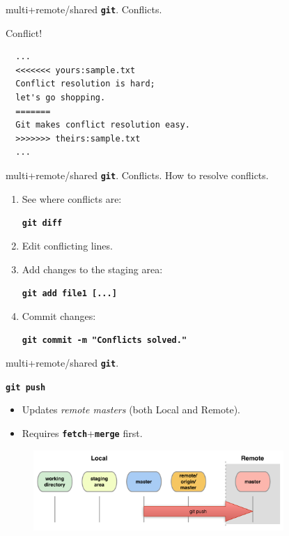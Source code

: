 \documentclass{beamer}
\newcommand{\git}{\texttt{\textbf{git}}\xspace}
\begin{document}
\begin{frame}[containsverbatim]{multi+remote/shared \git. Conflicts.}
  \begin{center}
    \alert{Conflict!}
  \end{center}
\begin{verbatim}
  ...
  <<<<<<< yours:sample.txt
  Conflict resolution is hard;
  let's go shopping.
  =======
  Git makes conflict resolution easy.
  >>>>>>> theirs:sample.txt
  ...
\end{verbatim}
\end{frame}


\begin{frame}{multi+remote/shared \git. Conflicts.}
How to resolve conflicts.
\begin{enumerate}
\item See where conflicts are:
  \begin{center}
  \texttt{\textbf{git diff}}
  \end{center}
\item Edit conflicting lines.
\item Add changes to the staging area:
  \begin{center}
    \texttt{\textbf{git add file1 [...]}}
  \end{center}
\item Commit changes:
  \begin{center}
    \texttt{\textbf{git commit -m "Conflicts solved."}}
  \end{center}
\end{enumerate}
\end{frame}

\begin{frame}{multi+remote/shared \git.}
  \begin{center}
    \texttt{\textbf{git push}}
  \end{center}
  \begin{itemize}
  \item Updates \emph{remote masters} (both Local and Remote).
  \item Requires \texttt{\textbf{fetch}}+\texttt{\textbf{merge}} first.
  \end{itemize}
  \begin{figure}
    \centering
    \includegraphics[width=9.5cm]{figs/local-remote-push}
  \end{figure}
\end{frame}
\end{document}
